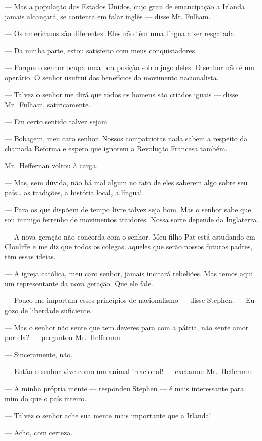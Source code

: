 --- Mas a população dos Estados Unidos, cujo grau de emancipação		
a Irlanda jamais alcançará, se contenta em falar inglês --- disse Mr.		
Fulham.

--- Os americanos são diferentes.  Eles não têm uma língua a ser
resgatada.

--- Da minha parte, estou satisfeito com meus conquistadores.

--- Porque o senhor ocupa uma boa posição sob o jugo deles.  O
senhor não é um operário.  O senhor usufrui dos benefícios do movimento
nacionalista.

--- Talvez o senhor me dirá que todos os homens são criados
iguais --- disse Mr.~Fulham, satiricamente.

--- Em certo sentido talvez sejam.

--- Bobagem, meu caro senhor.  Nossos compatriotas nada sabem a
respeito da chamada Reforma e espero que ignorem a Revolução Francesa
também.

Mr.~Heffernan voltou à carga.

--- Mas, sem dúvida, não há mal algum no fato de eles saberem
algo sobre seu país\ldots{} as tradições, a história local, a língua!

--- Para os que dispõem de tempo livre talvez seja bom.  Mas o
senhor sabe que sou inimigo ferrenho de movimentos traidores.  Nossa
sorte depende da Inglaterra.

--- A nova geração não concorda com o senhor.  Meu filho Pat
está estudando em Clonliffe e me diz que todos os colegas, aqueles que
serão nossos futuros padres, têm essas ideias.

--- A igreja católica, meu caro senhor, jamais incitará
rebeliões.  Mas temos aqui um representante da nova geração.  Que ele
fale.

--- Pouco me importam esses princípios de nacionalismo --- disse
Stephen.  --- Eu gozo de liberdade suficiente.

--- Mas o senhor não sente que tem deveres para com a pátria, não
sente amor por ela? --- perguntou Mr.~Heffernan.

--- Sinceramente, não.

--- Então o senhor vive como um animal irracional! --- exclamou Mr.~Heffernan.

--- A minha própria mente --- respondeu Stephen --- é mais
interessante para mim do que o país inteiro.

--- Talvez o senhor ache sua mente mais importante que a Irlanda!

--- Acho, com certeza.

